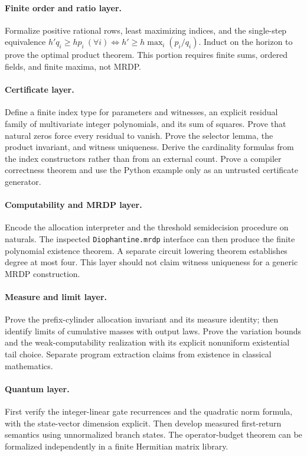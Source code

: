 \documentclass[11pt,letterpaper]{article}
\numberwithin{equation}{section}
\theoremstyle{definition}
\theoremstyle{remark}
\newcommand{\code}[1]{\nolinkurl{#1}}
\begin{document}
\paragraph{Finite order and ratio layer.}
Formalize positive rational rows, least maximizing indices, and the
single-step equivalence
$h'q_i\ge hp_i\ (\forall i)\iff h'\ge h\max_i(p_i/q_i)$.
Induct on the horizon to prove the optimal product theorem. This portion
requires finite sums, ordered fields, and finite maxima, not MRDP.

\paragraph{Certificate layer.}
Define a finite index type for parameters and witnesses, an explicit
residual family of multivariate integer polynomials, and its sum of
squares. Prove that natural zeros force every residual to vanish. Prove the
selector lemma, the product invariant, and witness uniqueness. Derive the
cardinality formulas from the index constructors rather than from an
external count. Prove a compiler correctness theorem and use the Python
example only as an untrusted certificate generator.

\paragraph{Computability and MRDP layer.}
Encode the allocation interpreter and the threshold semidecision procedure
on naturals. The inspected \code{Diophantine.mrdp} interface can then
produce the finite polynomial existence theorem. A separate circuit
lowering theorem establishes degree at most four. This layer should not
claim witness uniqueness for a generic MRDP construction.

\paragraph{Measure and limit layer.}
Prove the prefix-cylinder allocation invariant and its measure identity;
then identify limits of cumulative masses with output laws. Prove the
variation bounds and the weak-computability realization with its explicit
nonuniform existential tail choice. Separate program extraction claims from
existence in classical mathematics.

\paragraph{Quantum layer.}
First verify the integer-linear gate recurrences and the quadratic norm
formula, with the state-vector dimension explicit. Then develop measured
first-return semantics using unnormalized branch states. The
operator-budget theorem can be formalized independently in a finite
Hermitian matrix library.
\end{document}
